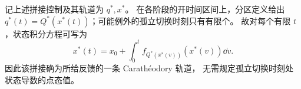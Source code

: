 记上述拼接控制及其轨道为 $q^*,x^*$。
在各阶段的开时间区间上，分区定义给出
$q^*(t)=Q^*(x^*(t))$；可能例外的孤立切换时刻只有有限个。
故对每个有限 $t$，状态积分方程可写为
\[
x^*(t)=x_0+\int_0^t f_{Q^*(x^*(v))}(x^*(v))\dd v.
\]
因此该拼接确为所给反馈的一条 Carath\'eodory 轨道，
无需规定孤立切换时刻处状态导数的点态值。
